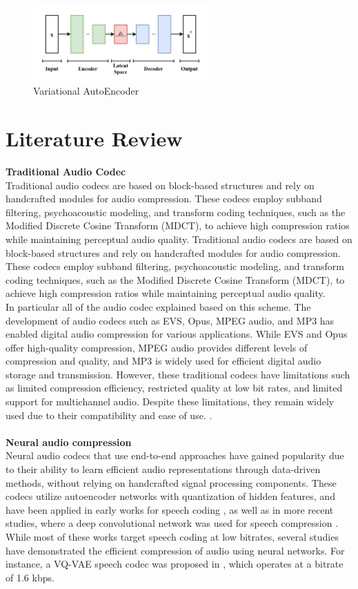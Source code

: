 \documentclass[12pt]{report}
\begin{document}
\begin{figure}[H]
\centering
\includegraphics[width=0.6\textwidth]{Images/VAE_Basic.png}
\caption{Variational AutoEncoder}
\end{figure}

\chapter{Literature Review}
\textbf{Traditional Audio Codec}\\
Traditional audio codecs are based on block-based structures and rely on handcrafted modules for audio compression. These codecs employ subband filtering, psychoacoustic modeling, and transform coding techniques, such as the Modified Discrete Cosine Transform (MDCT), to achieve high compression ratios while maintaining perceptual audio quality.
Traditional audio codecs are based on block-based structures and rely on handcrafted modules for audio compression. These codecs employ subband filtering, psychoacoustic modeling, and transform coding techniques, such as the Modified Discrete Cosine Transform (MDCT), to achieve high compression ratios while maintaining perceptual audio quality. \\
In particular all of the audio codec explained based on this scheme. The development of audio codecs such as EVS, Opus, MPEG audio, and MP3 has enabled digital audio compression for various applications. While EVS and Opus offer high-quality compression, MPEG audio provides different levels of compression and quality, and MP3 is widely used for efficient digital audio storage and transmission. However, these traditional codecs have limitations such as limited compression efficiency, restricted quality at low bit rates, and limited support for multichannel audio. Despite these limitations, they remain widely used due to their compatibility and ease of use. \cite{opus_codec, evs_codec, brandenburg1999mpeg, fraunhofer1997mp3}.
\\\\
\textbf{Neural audio compression} \\
Neural audio codecs that use end-to-end approaches have gained popularity due to their ability to learn efficient audio representations through data-driven methods, without relying on handcrafted signal processing components. These codecs utilize autoencoder networks with quantization of hidden features, and have been applied in early works for speech coding \cite{morishima1990speech}, as well as in more recent studies, where a deep convolutional network was used for speech compression \cite{kankanahalli2018end}. While most of these works target speech coding at low bitrates, several studies have demonstrated the efficient compression of audio using neural networks. For instance, a VQ-VAE speech codec was proposed in \cite{garbacea2019low}, which operates at a bitrate of 1.6 kbps.
\end{document}
